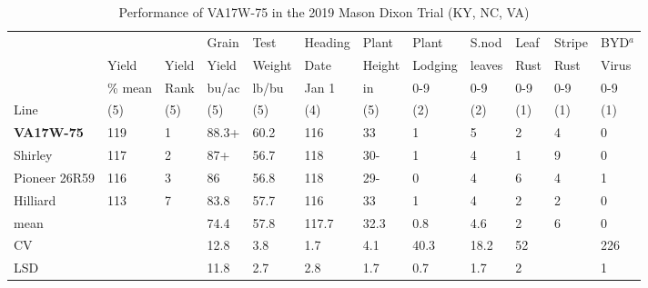 \documentclass[12pt, letterpaper]{article}
\begin{document}
\begin{landscape}
\begin{table}[h]

\caption{Performance of VA17W-75 in the 2019 Mason Dixon Trial (KY, NC, VA)}
\label{mdxn}
\begin{tabular}{llllllllllll}
\toprule
     &         &       & Grain & Test   & Heading & Plant  & Plant   & S.nod  & Leaf  & Stripe & BYD$^a$   \\
     & Yield   & Yield & Yield & Weight & Date    & Height & Lodging & leaves & Rust  & Rust   & Virus \\
     & \% mean & Rank  & bu/ac & lb/bu  & Jan 1   & in     & 0-9     & 0-9    & 0-9   & 0-9    & 0-9 \\
Line & (5)     & (5)   & (5)   & (5)    & (4)     & (5)    & (2)     & (2)    & (1)   & (1)   & (1)   \\
\midrule
\textbf{VA17W-75} & 119 &  1 & 88.3+ & 60.2 & 116 & 33 & 1 & 5 &  2 &  4 &   0 \\
Shirley & 117 &  2 & 87+ & 56.7 & 118 & 30- & 1 & 4 &  1 &  9 &   0 \\
Pioneer 26R59 & 116 &  3 & 86 & 56.8 & 118 & 29- & 0 & 4 &  6 &  4 &   1 \\
Hilliard & 113 &  7 & 83.8 & 57.7 & 116 & 33 & 1 & 4 &  2 &  2 &   0 \\
\midrule
mean &  &  & 74.4 & 57.8 & 117.7 & 32.3 & 0.8 & 4.6 &  2 &  6 &   0 \\
CV   &  &  & 12.8 & 3.8 & 1.7 & 4.1 & 40.3 & 18.2 & 52 &  & 226 \\
LSD  &  &  & 11.8 & 2.7 & 2.8 & 1.7 & 0.7 & 1.7 &  2 &  &   1 \\
\bottomrule
\end{tabular}


\end{table}
\end{landscape}
\end{document}
